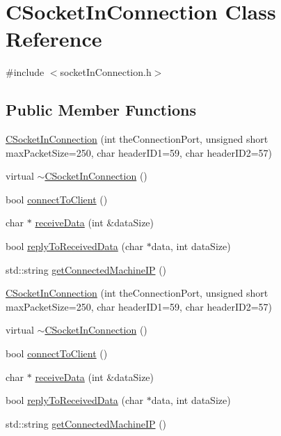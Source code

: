\hypertarget{classCSocketInConnection}{}\section{C\+Socket\+In\+Connection Class Reference}
\label{classCSocketInConnection}


{\ttfamily \#include $<$socket\+In\+Connection.\+h$>$}

\subsection*{Public Member Functions}
\begin{DoxyCompactItemize}
\item 
\hyperlink{classCSocketInConnection_aa1fedace468aaaacc9ed53364fe54dd7}{C\+Socket\+In\+Connection} (int the\+Connection\+Port, unsigned short max\+Packet\+Size=250, char header\+I\+D1=59, char header\+I\+D2=57)
\item 
virtual \hyperlink{classCSocketInConnection_a649b4a046dd268a3d0eeddf9b7513032}{$\sim$\+C\+Socket\+In\+Connection} ()
\item 
bool \hyperlink{classCSocketInConnection_a3573b19ec54411ee9a275ffeb9712cb4}{connect\+To\+Client} ()
\item 
char $\ast$ \hyperlink{classCSocketInConnection_a35d54308230b9cea6f8af95a98441a72}{receive\+Data} (int \&data\+Size)
\item 
bool \hyperlink{classCSocketInConnection_a725ab613c935ef474c9c0ede64533770}{reply\+To\+Received\+Data} (char $\ast$data, int data\+Size)
\item 
std\+::string \hyperlink{classCSocketInConnection_a2d41173714abbf83ffef5663062b453a}{get\+Connected\+Machine\+IP} ()
\item 
\hyperlink{classCSocketInConnection_aa1fedace468aaaacc9ed53364fe54dd7}{C\+Socket\+In\+Connection} (int the\+Connection\+Port, unsigned short max\+Packet\+Size=250, char header\+I\+D1=59, char header\+I\+D2=57)
\item 
virtual \hyperlink{classCSocketInConnection_ae4e9d03d0f2e6f28b7845d8cd3db6d72}{$\sim$\+C\+Socket\+In\+Connection} ()
\item 
bool \hyperlink{classCSocketInConnection_a3573b19ec54411ee9a275ffeb9712cb4}{connect\+To\+Client} ()
\item 
char $\ast$ \hyperlink{classCSocketInConnection_ac298cb80be140dd89e6c9ac96f0fb031}{receive\+Data} (int \&data\+Size)
\item 
bool \hyperlink{classCSocketInConnection_a725ab613c935ef474c9c0ede64533770}{reply\+To\+Received\+Data} (char $\ast$data, int data\+Size)
\item 
std\+::string \hyperlink{classCSocketInConnection_a2d41173714abbf83ffef5663062b453a}{get\+Connected\+Machine\+IP} ()
\end{DoxyCompactItemize}

